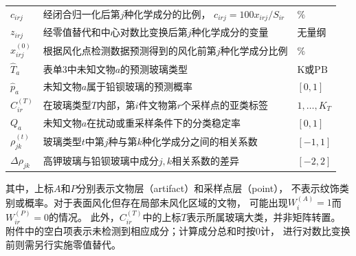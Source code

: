 \begin{table}[H]
\begin{tabularx}{0.96\textwidth}{C{2.6cm} X C{3.1cm}}
    \(c_{irj}\)
    & 经闭合归一化后第\(j\)种化学成分的比例，
      \(c_{irj}=100x_{irj}/S_{ir}\)
    & \(\%\) \\

    \(z_{irj}\)
    & 经零值替代和中心对数比变换后第\(j\)种化学成分的变量
    & 无量纲 \\

    \(\widehat{x}_{irj}^{(0)}\)
    & 根据风化点检测数据预测得到的风化前第\(j\)种化学成分比例
    & \(\%\) \\

    \(\widehat{T}_a\)
    & 表单3中未知文物\(a\)的预测玻璃类型
    & \(\mathrm{K}\)或\(\mathrm{PB}\) \\

    \(\widehat{p}_a\)
    & 未知文物\(a\)属于铅钡玻璃的预测概率
    & \([0,1]\) \\

    \(C_{ir}^{(T)}\)
    & 在玻璃类型\(T\)内部，第\(i\)件文物第\(r\)个采样点的亚类标签
    & \(1,\ldots,K_T\) \\

    \(Q_a\)
    & 未知文物\(a\)在扰动或重采样条件下的分类稳定率
    & \([0,1]\) \\

    \(\rho_{jk}^{(t)}\)
    & 玻璃类型\(t\)中第\(j\)种与第\(k\)种化学成分之间的相关系数
    & \([-1,1]\) \\

    \(\Delta\rho_{jk}\)
    & 高钾玻璃与铅钡玻璃中成分\(j,k\)相关系数的差异
    & \([-2,2]\) \\

    \bottomrule
  \end{tabularx}
\end{table}

其中，上标\(A\)和\(P\)分别表示文物层（artifact）和采样点层（point），
不表示纹饰类别或概率。对于表面风化但存在局部未风化区域的文物，
可能出现\(W_i^{(A)}=1\)而\(W_{ir}^{(P)}=0\)的情况。
此外，\(C_{ir}^{(T)}\)中的上标\(T\)表示所属玻璃大类，并非矩阵转置。
附件中的空白项表示未检测到相应成分；计算成分总和时按0计，
进行对数比变换前则需另行实施零值替代。